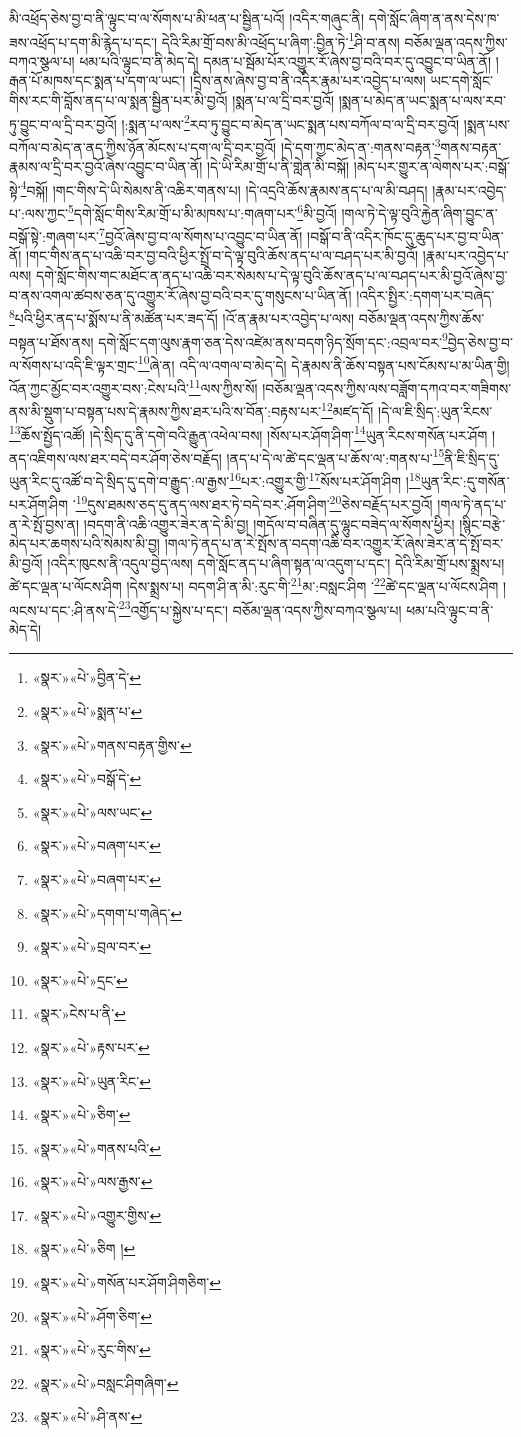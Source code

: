 མི་འཕྲོད་ཅེས་བྱ་བ་ནི་ལྟུང་བ་ལ་སོགས་པ་མི་ཕན་པ་སྦྱིན་པའོ། །འདིར་གཞུང་ནི། དགེ་སློང་ཞིག་ན་ནས་དེས་ཁ་ཟས་འཕྲོད་པ་དག་མི་རྙེད་པ་དང་། དེའི་རིམ་གྲོ་བས་མི་འཕྲོད་པ་ཞིག་:བྱིན་ཏེ་\footnote{«སྣར་»«པེ་»བྱིན་དེ་}ཤི་བ་ནས། བཅོམ་ལྡན་འདས་ཀྱིས་བཀའ་སྩལ་པ། ཕམ་པའི་ལྟུང་བ་ནི་མེད་དེ། དམན་པ་སྦོམ་པོར་འགྱུར་རོ་ཞེས་བྱ་བའི་བར་དུ་འབྱུང་བ་ཡིན་ནོ། །རྒན་པོ་མཁས་དང་སྨན་པ་དག་ལ་ཡང་། །དྲིས་ནས་ཞེས་བྱ་བ་ནི་འདིར་རྣམ་པར་འབྱེད་པ་ལས། ཡང་དགེ་སློང་གིས་རང་གི་བློས་ནད་པ་ལ་སྨན་སྦྱིན་པར་མི་བྱའོ། །སྨན་པ་ལ་དྲི་བར་བྱའོ། །སྨན་པ་མེད་ན་ཡང་སྨན་པ་ལས་རབ་ཏུ་བྱུང་བ་ལ་དྲི་བར་བྱའོ། །:སྨན་པ་ལས་\footnote{«སྣར་»«པེ་»སྨན་པ་}རབ་ཏུ་བྱུང་བ་མེད་ན་ཡང་སྨན་པས་བཀོལ་བ་ལ་དྲི་བར་བྱའོ། །སྨན་པས་བཀོལ་བ་མེད་ན་ནད་ཀྱིས་ཉོན་མོངས་པ་དག་ལ་དྲི་བར་བྱའོ། །དེ་དག་ཀྱང་མེད་ན་:གནས་བརྟན་\footnote{«སྣར་»«པེ་»གནས་བརྟན་གྱིས་}གནས་བརྟན་རྣམས་ལ་དྲི་བར་བྱའོ་ཞེས་འབྱུང་བ་ཡིན་ནོ། །དེ་ཡི་རིམ་གྲོ་པ་ནི་གླེན་མི་བསྐོ། །མེད་པར་གྱུར་ན་ལེགས་པར་:བསྒོ་སྟེ་\footnote{«སྣར་»«པེ་»བསྒོ་དེ་}བསྐོ། །གང་གིས་དེ་ཡི་སེམས་ནི་འཆིར་གནས་པ། །དེ་འདྲའི་ཆོས་རྣམས་ནད་པ་ལ་མི་བཤད། །རྣམ་པར་འབྱེད་པ་:ལས་ཀྱང་\footnote{«སྣར་»«པེ་»ལས་ཡང་}དགེ་སློང་གིས་རིམ་གྲོ་པ་མི་མཁས་པ་:གཞག་པར་\footnote{«སྣར་»«པེ་»བཞག་པར་}མི་བྱའོ། །གལ་ཏེ་དེ་ལྟ་བུའི་རྐྱེན་ཞིག་བྱུང་ན་བསྒོ་སྟེ་:གཞག་པར་\footnote{«སྣར་»«པེ་»བཞག་པར་}བྱའོ་ཞེས་བྱ་བ་ལ་སོགས་པ་འབྱུང་བ་ཡིན་ནོ། །བསྒོ་བ་ནི་འདིར་ཁོང་དུ་ཆུད་པར་བྱ་བ་ཡིན་ནོ། །གང་གིས་ནད་པ་འཆི་བར་བྱ་བའི་ཕྱིར་སྤྲོ་བ་དེ་ལྟ་བུའི་ཆོས་ནད་པ་ལ་བཤད་པར་མི་བྱའོ། །རྣམ་པར་འབྱེད་པ་ལས། དགེ་སློང་གིས་གང་མཐོང་ན་ནད་པ་འཆི་བར་སེམས་པ་དེ་ལྟ་བུའི་ཆོས་ནད་པ་ལ་བཤད་པར་མི་བྱའོ་ཞེས་བྱ་བ་ནས་འགལ་ཚབས་ཅན་དུ་འགྱུར་རོ་ཞེས་བྱ་བའི་བར་དུ་གསུངས་པ་ཡིན་ནོ། །འདིར་སྤྱིར་:དགག་པར་བཞེད་\footnote{«སྣར་»«པེ་»དགག་པ་གཞེད་}པའི་ཕྱིར་ནད་པ་སྨོས་པ་ནི་མཚོན་པར་ཟད་དོ། །འོ་ན་རྣམ་པར་འབྱེད་པ་ལས། བཅོམ་ལྡན་འདས་ཀྱིས་ཆོས་བསྟན་པ་ཐོས་ནས། དགེ་སློང་དག་ལུས་རྣག་ཅན་དེས་འཛེམ་ནས་བདག་ཉིད་སྲོག་དང་:འབྲལ་བར་\footnote{«སྣར་»«པེ་»བྲལ་བར་}བྱེད་ཅེས་བྱ་བ་ལ་སོགས་པ་འདི་ཇི་ལྟར་གྲང་\footnote{«སྣར་»«པེ་»དྲང་}ཞེ་ན། འདི་ལ་འགལ་བ་མེད་དེ། དེ་རྣམས་ནི་ཆོས་བསྟན་པས་ངོམས་པ་མ་ཡིན་གྱི། འོན་ཀྱང་མྱོང་བར་འགྱུར་བས་:ངེས་པའི་\footnote{«སྣར་»ངེས་པ་ནི་}ལས་ཀྱིས་སོ། །བཅོམ་ལྡན་འདས་ཀྱིས་ལས་བཟློག་དཀའ་བར་གཟིགས་ནས་མི་སྡུག་པ་བསྟན་པས་དེ་རྣམས་ཀྱིས་ཐར་པའི་ས་བོན་:བརྟས་པར་\footnote{«སྣར་»«པེ་»རྟས་པར་}མཛད་དོ། །དེ་ལ་ཇི་སྲིད་:ཡུན་རིངས་\footnote{«སྣར་»«པེ་»ཡུན་རིང་}ཆོས་སྤྱོད་འཚོ། །དེ་སྲིད་དུ་ནི་དགེ་བའི་རྒྱུན་འཕེལ་བས། །སོས་པར་ཤོག་ཤིག་\footnote{«སྣར་»«པེ་»ཅིག་}ཡུན་རིངས་གསོན་པར་ཤོག །ནད་འཇིགས་ལས་ཐར་བདེ་བར་ཤོག་ཅེས་བརྗོད། །ནད་པ་དེ་ལ་ཚེ་དང་ལྡན་པ་ཆོས་ལ་:གནས་པ་\footnote{«སྣར་»«པེ་»གནས་པའི་}ནི་ཇི་སྲིད་དུ་ཡུན་རིང་དུ་འཚོ་བ་དེ་སྲིད་དུ་དགེ་བ་རྒྱུད་:ལ་རྒྱས་\footnote{«སྣར་»«པེ་»ལས་རྒྱས་}པར་:འགྱུར་གྱི་\footnote{«སྣར་»«པེ་»འགྱུར་གྱིས་}སོས་པར་ཤོག་ཤིག །\footnote{«སྣར་»«པེ་»ཅིག །}ཡུན་རིང་:དུ་གསོན་པར་ཤོག་ཤིག ་\footnote{«སྣར་»«པེ་»གསོན་པར་ཤོག་ཤིགཅིག་}དུས་ཐམས་ཅད་དུ་ནད་ལས་ཐར་ཏེ་བདེ་བར་:ཤོག་ཤིག་\footnote{«སྣར་»«པེ་»ཤོག་ཅིག་}ཅེས་བརྗོད་པར་བྱའོ། །གལ་ཏེ་ནད་པ་ན་རེ་སྤོ་བྱས་ན། །བདག་ནི་འཆི་འགྱུར་ཟེར་ན་དེ་མི་བྱ། །གདོལ་བ་བཞིན་དུ་ལྷུང་བཟེད་ལ་སོགས་ཕྱིར། །སྙིང་བརྩེ་མེད་པར་ཆགས་པའི་སེམས་མི་བྱ། །གལ་ཏེ་ནད་པ་ན་རེ་སྤོས་ན་བདག་འཆི་བར་འགྱུར་རོ་ཞེས་ཟེར་ན་དེ་སྤོ་བར་མི་བྱའོ། །འདིར་ཁུངས་ནི་འདུལ་བྱེད་ལས། དགེ་སློང་ནད་པ་ཞིག་སྟན་ལ་འདུག་པ་དང་། དེའི་རིམ་གྲོ་པས་སྨྲས་པ། ཚེ་དང་ལྡན་པ་ལོངས་ཤིག །དེས་སྨྲས་པ། བདག་ཤི་ན་མི་:རུང་གི་\footnote{«སྣར་»«པེ་»རུང་གིས་}མ་:བསླང་ཤིག ་\footnote{«སྣར་»«པེ་»བསླང་ཤིགཞིག་}ཚེ་དང་ལྡན་པ་ལོངས་ཤིག །ལངས་པ་དང་:ཤི་ནས་དེ་\footnote{«སྣར་»«པེ་»ཤི་ནས་}འགྱོད་པ་སྐྱེས་པ་དང་། བཅོམ་ལྡན་འདས་ཀྱིས་བཀའ་སྩལ་པ། ཕམ་པའི་ལྟུང་བ་ནི་མེད་དེ། 